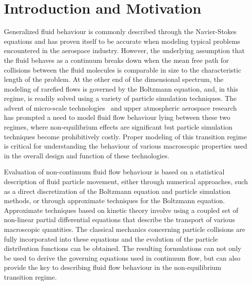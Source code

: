 \documentclass[titlepage,11pt,letterpaper]{article}
\begin{document}
\thispagestyle{empty}\titleRR
\clearpage
\setcounter{page}{1}


\section{Introduction and Motivation}

Generalized fluid behaviour is commonly described through the Navier-Stokes equations and 
has proven itself to be accurate when modeling typical problems encountered in the aerospace 
industry. However, the underlying assumption that the fluid behaves as a continuum breaks 
down when the mean free path for collisions between the fluid molecules is comparable in 
size to the characteristic length of the problem. At the other end of the dimensional 
spectrum, the modeling of rarefied flows is governed by the Boltzmann equation, and, in this regime, is 
readily solved using a variety of particle simulation techniques. The advent of micro-scale 
technologies~\cite{hellman:2007} and upper atmospheric aerospace 
research~\cite{divitiis:1994} has prompted a need to model fluid flow behaviour lying 
between these two regimes, where non-equilibrium effects are significant but particle 
simulation techniques become prohibitively costly. Proper modeling of this transition 
regime is critical for understanding the behaviour of various macroscopic properties used 
in the overall design and function of these technologies.

Evaluation of non-continuum fluid flow behaviour is based on a statistical description of 
fluid particle movement, either through numerical approaches, such as a direct 
discretization of the Boltzmann equation and particle simulation methods, or through 
approximate techniques for the Boltzmann equation. Approximate techniques based on kinetic 
theory involve using a coupled set of non-linear partial differential equations that 
describe the transport of various macroscopic quantities. The classical mechanics 
concerning particle collisions are fully incorporated into these equations and the 
evolution of the particle distribution functions can be obtained. The resulting 
formulations can not only be used to derive the governing equations used in continuum 
flow, but can also provide the key to describing fluid flow behaviour in the non-equilibrium transition 
regime.
\end{document}
